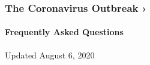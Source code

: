 \href{https://www.nytimes3xbfgragh.onion/news-event/coronavirus?action=click\&pgtype=Article\&state=default\&region=MAIN_CONTENT_3\&context=storylines_faq}{}

\hypertarget{the-coronavirus-outbreak-}{%
\subsubsection{The Coronavirus Outbreak
›}\label{the-coronavirus-outbreak-}}

\hypertarget{frequently-asked-questions}{%
\paragraph{Frequently Asked
Questions}\label{frequently-asked-questions}}

Updated August 6, 2020

